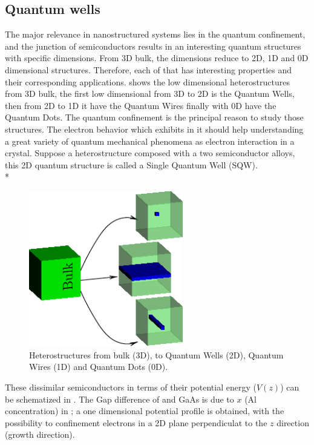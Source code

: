 \subsection{Quantum wells}
\label{subsection:chapter-1-quantum-wells}
\vspace{-10mm} 
The major relevance in nanostructured systems lies in the quantum confinement, and 
the junction of semiconductors results in an interesting quantum structures with specific
dimensions. From 3D bulk, the dimensions reduce to 2D, 1D and 0D dimensional structures.
Therefore, each of that has interesting properties and their corresponding applications. 
 shows the low dimensional heterostructures from 3D bulk, the first low dimensional from 3D to 2D is the Quantum Wells, then from 2D to 1D it have the
Quantum Wires finally with 0D have the Quantum Dots. The quantum confinement
is the principal reason to study those structures. The electron behavior which exhibits
in it should  help understanding a great variety of quantum mechanical phenomena
as electron interaction in a crystal. Suppose a heterostructure composed with a two
semiconductor alloys, this 2D quantum structure is called a Single Quantum
Well (SQW).\\*
\begin{figure}
	\centering
	\includegraphics[width=0.6\textwidth]{../figures/chapter-1/heterostructures/out/lds-00}
	\caption{Heterostructures from bulk (3D), to Quantum Wells (2D), Quantum Wires (1D) and Quantum Dots (0D).  }
	\label{fig:subsection-1.2-heterostructures}
\end{figure}
These  dissimilar semiconductors in terms of their potential energy ($V(z)$) can be schematized in . The Gap difference of \algaas and GaAs is due to $x$ (Al concentration) in \algaas;  a one dimensional potential profile is obtained, with the possibility to confinement electrons in a 2D plane perpendiculat to the  $z$ direction (growth direction). 
